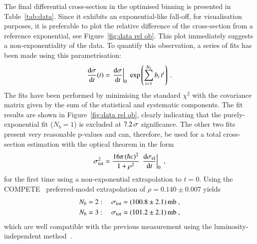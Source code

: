 The final differential cross-section in the optimised binning is presented in Table~\ref{tab:data}. Since it exhibits an exponential-like fall-off, for visualisation purposes, it is preferable to plot the relative difference of the cross-section from a reference exponential, %
see Figure~\ref{fig:data rel ob}. This plot immediately suggests a non-exponentiality of the data. To quantify this observation, a series of fits has been made using this parametrisation:
\begin{equation}
\label{fit param}
{{\rm d}\sigma\over{\rm d}t}(t) = \left. {\rm d}\sigma\over{\rm d} t\right|_{0} \ \exp\left( \sum\limits_{i = 1}^{N_{b}} b_i\, t^i \right) \:.
\end{equation}
The fits have been performed by minimising the standard $\chi^2$ with the covariance matrix given by the sum of the statistical and systematic components. The fit results are shown in Figure~\ref{fig:data rel ob}, clearly indicating that the purely-exponential fit ($N_b = 1$) is excluded at $7.2\,{\rm \sigma}$ significance. The other two fits present very reasonable p-values and can, therefore, be used for a total cross-section estimation with the optical theorem in the form
\begin{equation}
\label{eq:si tot}
\sigma_{\rm tot}^2 = {16\pi\, (\hbar c)^2\over 1 + \rho^2}\, \left. {\rm d}\sigma_{\rm el}\over{\rm d} t\right|_0\ ,
\end{equation}
for the first time using a non-exponential extrapolation to $t=0$. Using the COMPETE~\cite{compete} preferred-model extrapolation of $\rho = 0.140\pm 0.007$ yields
\begin{equation}
\label{eq:si tot results}
	\begin{aligned}
		N_b &= 2:\quad \sigma_{\rm tot} = (100.8 \pm 2.1)\un{mb}\ ,\\	%
		N_b &= 3:\quad \sigma_{\rm tot} = (101.2 \pm 2.1)\un{mb}\ ,\\	%
	\end{aligned}
\end{equation}
which are well compatible with the previous measurement using the luminosity-independent method~\cite{prl111}.




